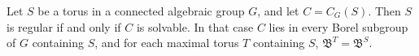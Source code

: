 Let $S$ be a torus in a connected algebraic group $G$, and let $C = C_G(S)$. Then $S$ is regular if and only if $C$ is solvable. In that case $C$ lies in every Borel subgroup of $G$ containing $S$, and for each maximal torus $T$ containing $S$, $\mathfrak{B}^T = \mathfrak{B}^S$.
